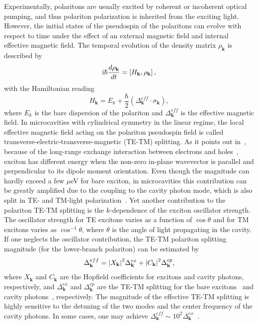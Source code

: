 Experimentally, polaritons are usually excited by coherent or incoherent optical pumping, and thus polariton polarization is inherited from the exciting light.
However, the initial states of the pseudospin of the polaritons can evolve with respect to time under the effect of an external magnetic field and internal effective magnetic field.
The temporal evolution of the density matrix $\rho_\mathbf{k}$ is described by
%
\begin{equation}
\mathrm{i}\hbar \frac{d \rho_\mathbf{k}}{dt} = \left[ H_\mathbf{k}, \rho_\mathbf{k}\right],
\label{eq:Ch1_evolution_spin}
\end{equation}
%
with the Hamiltonian reading
\begin{equation}
    H_\mathbf{k} = E_k + \frac{\hbar}{2}\left( \Delta^{eff}_\mathbf{k} \cdot \sigma_\mathbf{k} \right),
    \label{eq:Ch1_evolution_spin2}
\end{equation}
where $E_k$ is the bare dispersion of the polariton and $\Delta_\mathbf{k}^{eff}$ is the effective magnetic field.
In microcavities with cylindrical symmetry in the linear regime, the local effective magnetic field acting on the polariton pseudospin field is called transverse-electric-transverse-magnetic (TE-TM) splitting.
As it points out in~\cite{Maialle:1993aa}, because of the long-range exchange interaction between electrons and holes~\cite{pikus1971exchange}, exciton has different energy when the non-zero in-plane wavevector is parallel and perpendicular to its dipole moment orientation. Even though the magnitude can hardly exceed a few $\mu$eV for bare exciton, in microcavities this contribution can be greatly amplified due to the coupling to the cavity photon mode, which is also split in TE- and TM-light polarization~\cite{Panzarini:1999aa}. Yet another contribution to the polariton TE-TM splitting is the $k$-dependence of the exciton oscillator strength. The oscillator strength for TE excitons varies as a function of $\cos\theta$ and for TM excitons varies as $\cos^{-1}\theta$, where $\theta$ is the angle of light propagating in the cavity.
If one neglects the oscillator contribution, the TE-TM polariton splitting magnitude (for the lower-branch polariton) can be estimated by
%
\begin{equation}
    \Delta_\mathbf{k}^{eff} = \abs{X_\mathbf{k}}^2 \Delta_\mathbf{k}^{ex} + \abs{C_\mathbf{k}}^2\Delta_\mathbf{k}^{cp},
    \label{eq:Ch1_TE-TM_effect}
\end{equation}
%
where $X_\mathbf{k}$ and $C_\mathbf{k}$ are the Hopfield coefficients for excitons and cavity photons, respectively, and $\Delta_\mathbf{k}^{ex}$ and $\Delta_\mathbf{k}^{cp}$ are the TE-TM splitting for the bare excitons~\cite{Maialle:1993aa} and cavity photons~\cite{Panzarini:1999aa}, respectively.
The magnitude of the effective TE-TM splitting is highly sensitive to the detuning of the two modes and the center frequency of the cavity photons.
In some cases, one may achieve $\Delta_\mathbf{k}^{eff} \sim 10^2 \Delta_\mathbf{k}^{ex}$~\cite{Shelykh:2009aa}.

